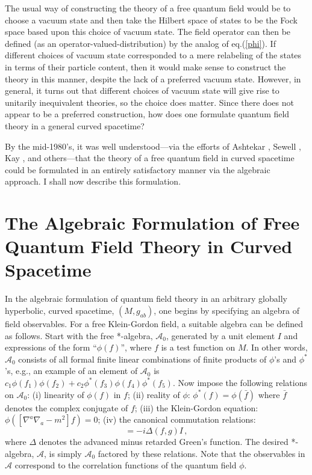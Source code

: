 \documentclass[12pt,epsf,amsfonts,amssymb]{article}
\begin{document}
The usual way of constructing the theory of a free quantum field would
be to choose a vacuum state and then take the Hilbert space of states
to be the Fock space based upon this choice of vacuum state. The field
operator can then be defined (as an operator-valued-distribution) by
the analog of eq.(\ref{phi}). If different choices of vacuum state
corresponded to a mere relabeling of the states in terms of their
particle content, then it would make sense to construct the theory in
this manner, despite the lack of a preferred vacuum state. However, in
general, it turns out that different choices of vacuum state will give
rise to unitarily inequivalent theories, so the choice does
matter. Since there does not appear to be a preferred construction,
how does one formulate quantum field theory in a general curved
spacetime?

By the mid-1980's, it was well understood---via the efforts of
Ashtekar \cite{a}, Sewell \cite{se}, Kay \cite{k}, and others---that
the theory of a free quantum field in curved spacetime could be
formulated in an entirely satisfactory manner via the algebraic
approach. I shall now describe this formulation.

\section{The Algebraic Formulation of Free Quantum Field Theory 
in Curved Spacetime}

In the algebraic formulation of quantum field theory in an arbitrary
globally hyperbolic, curved spacetime, $(M, g_{ab})$, one begins by
specifying an algebra of field observables. For a free Klein-Gordon
field, a suitable algebra can be defined as follows. Start with the
free *-algebra, ${\mathcal A}_0$, generated by a unit element $I$ and
expressions of the form ``$\phi(f)$'', 
where $f$ is a test function on $M$. In other words,
${\mathcal A}_0$ consists of all formal finite linear combinations of
finite products of $\phi$'s and $\phi^*$'s, e.g., an example of an
element of ${\mathcal A}_0$ is $c_1 \phi(f_1) \phi(f_2) + c_2 \phi^*
(f_3) \phi(f_4) \phi^*(f_5)$. Now impose the following relations on
${\mathcal A}_0$: (i) linearity of $\phi(f)$ in $f$; (ii) reality of
$\phi$: $\phi^*(f) = \phi(\bar{f})$ where $\bar{f}$ denotes the
complex conjugate of $f$; (iii) the Klein-Gordon equation:
$\phi([\nabla^a \nabla_a - m^2] f) = 0$; (iv) the canonical
commutation relations:
\begin{equation}
[\phi(f), \phi(g)] = - i \Delta(f,g) I \, ,
\end{equation}
where $\Delta$ denotes the advanced minus retarded Green's
function. The desired *-algebra, $\mathcal A$, is simply ${\mathcal
A}_0$ factored by these relations. Note that the observables in
${\mathcal A}$ correspond to the correlation functions of the quantum
field $\phi$.
\end{document}
